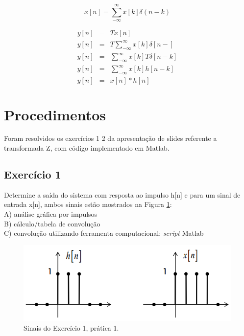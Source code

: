 \begin{equation}
	x[n] = \sum_{-\infty}^{\infty}x[k]\delta(n-k)
    \label{definicao_delta_discreto}
\end{equation}

\begin{eqnarray}
	y[n] &=& T{x[n]} \nonumber\\
	y[n] &=& T{\sum_{-\infty}^{\infty} x[k]\delta [n-]} \nonumber\\
    y[n] &=& \sum_{-\infty}^{\infty} x[k]T{\delta [n-k]} \nonumber\\
    y[n] &=& \sum_{-\infty}^{\infty} x[k]h[n-k] \nonumber\\
    y[n] &=& x[n]*h[n]
    \label{Convolucao_discreto}
\end{eqnarray}

\section{Procedimentos}
Foram resolvidos os exercícios 1 2 da apresentação de slides referente a transformada Z, com código implementado em Matlab.

\subsection{Exercício 1}
Determine a saída do sistema com
resposta ao impulso h[n] e para um sinal de entrada
x[n], ambos sinais estão mostrados na Figura \ref{fig:procedimento_pr1_ex1}:\\
A) análise gráfica por impulsos \\
B) cálculo/tabela de convolução \\
C) convolução utilizando ferramenta
computacional: \emph{script} Matlab

\begin{figure}[!th]
	\centering
    \includegraphics[scale = .7]{Imagens/Execicio1.PNG}
    \caption{Sinais do Exercício 1, prática 1.}
 \label{fig:procedimento_pr1_ex1}
\end{figure}

